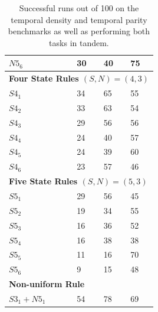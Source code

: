 \documentclass{elsarticle}
\begin{document}
\begin{multicols}{2}
\begin{table}[H]
\begin{tabular}{|l|l|l|l|}
			$N5_{6}$       & 30                & 40          & 75          \\ \hline
			\multicolumn{4}{|l|}{\textbf{Four State Rules \boldmath$(S,N) = (4,3)$}} \\ 
			\hline
			$S4_{1}$       & 34                & 65          & 55          \\ \hline
			$S4_{2}$       & 33                & 63          & 54          \\ \hline
			$S4_{3}$       & 29                & 56          & 56          \\ \hline
			$S4_{4}$       & 24                & 40          & 57          \\ \hline
			$S4_{5}$       & 24                & 39          & 60          \\ \hline
			$S4_{6}$       & 23                & 57          & 46          \\ \hline
			\multicolumn{4}{|l|}{\textbf{Five State Rules \boldmath$(S,N) = (5,3)$}} \\ 
			\hline
			$S5_{1}$       & 29                & 56          & 45          \\ \hline
			$S5_{2}$       & 19                & 34          & 55          \\ \hline
			$S5_{3}$       & 16                & 36          & 52          \\ \hline
			$S5_{4}$       & 16                & 38          & 38          \\ \hline
			$S5_{5}$       & 11                & 16          & 70          \\ \hline
			$S5_{6}$       & 9                 & 15          & 48          \\ \hline
			\multicolumn{4}{|l|}{\textbf{Non-uniform Rule}} \\ \hline
			$S3_1 +  N5_1$ & 54                & 78          & 69          \\ \hline
		\end{tabular}
		\caption{Successful runs out of 100 on the temporal density and temporal parity 
			benchmarks as well as performing both tasks in tandem.
		}
		\label{table:results_temp_dens}
	\end{table}
	
	

\end{multicols}
\end{document}
